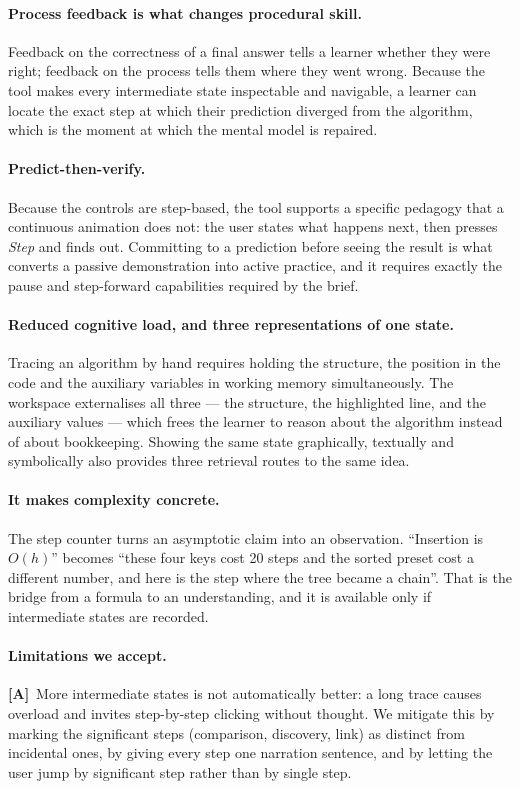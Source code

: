 \documentclass[11pt,a4paper]{article}
\newcommand{\A}{\textcolor{asmc}{\textbf{[A]}}}     %
\begin{document}
\paragraph{Process feedback is what changes procedural skill.} Feedback on the correctness
of a final answer tells a learner whether they were right; feedback on the process tells them
where they went wrong. Because the tool makes every intermediate state inspectable and
navigable, a learner can locate the exact step at which their prediction diverged from the
algorithm, which is the moment at which the mental model is repaired.

\paragraph{Predict-then-verify.} Because the controls are step-based, the tool supports a
specific pedagogy that a continuous animation does not: the user states what happens next,
then presses \emph{Step} and finds out. Committing to a prediction before seeing the result
is what converts a passive demonstration into active practice, and it requires exactly the
pause and step-forward capabilities required by the brief.

\paragraph{Reduced cognitive load, and three representations of one state.} Tracing an
algorithm by hand requires holding the structure, the position in the code and the
auxiliary variables in working memory simultaneously. The workspace externalises all three
--- the structure, the highlighted line, and the auxiliary values --- which frees the
learner to reason about the algorithm instead of about bookkeeping. Showing the same state
graphically, textually and symbolically also provides three retrieval routes to the same
idea.

\paragraph{It makes complexity concrete.} The step counter turns an asymptotic claim into an
observation. ``Insertion is $O(h)$'' becomes ``these four keys cost 20 steps and the sorted
preset cost a different number, and here is the step where the tree became a chain''. That
is the bridge from a formula to an understanding, and it is available only if intermediate
states are recorded.

\paragraph{Limitations we accept.} \A\ More intermediate states is not automatically better:
a long trace causes overload and invites step-by-step clicking without thought. We mitigate
this by marking the significant steps (comparison, discovery, link) as distinct from
incidental ones, by giving every step one narration sentence, and by letting the user jump
by significant step rather than by single step.
\end{document}
